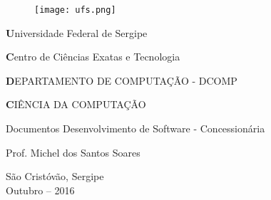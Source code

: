 \begin{titlepage}

\newcommand{\universidade}{Universidade Federal de Sergipe}
\newcommand{\centro}{Centro de Ciências Exatas e Tecnologia}
\newcommand{\departamento}{DEPARTAMENTO DE COMPUTAÇÃO - DCOMP}
\newcommand{\curso}{CIÊNCIA DA COMPUTAÇÃO}

\newcommand{\titulo}{Documentos Desenvolvimento de Software - Concessionária}

\newcommand{\professor}{Prof. Michel dos Santos Soares }

\begin{center}
\begin{figure}[t]
	\centering
	\texttt{[image: ufs.png]}
\end{figure}
{\large \textbf \universidade}
\par
{\large \textbf \centro}
\par
{\large \textbf \departamento}
\par
{\large \textbf \curso}
\par
\vspace{60pt}

{\large \titulo}
\par
\vspace{60pt}

{\large \professor}
\par
\vfill

{\large São Cristóvão, Sergipe}\\
{\large Outubro -- 2016}
\end{center}
\end{titlepage}



\newcommand{\alunoA}{DIMITRI CARVALHO MENEZES -- 201120000786}
\newcommand{\alunoB}{JOÃO MATEUS SANTANA DA CUNHA -- 201110007166}
\newcommand{\alunoC}{KEOMAS DA SILVA SANTOS -- 201220001370}
\newcommand{\alunoD}{LUCAS RENATO ARAGÃO SILVA -- 201220001325}
\newcommand{\alunoE}{RAABE NOA SANTOS CORREIA -- 201110008850}
\newcommand{\alunoF}{THARLYSSON BRENO LIMA DE MENEZES -- 201220002117}

\newcommand{\alunoG}{JOMAR GONÇALVES RAMOS -- 201020000940}
\newcommand{\alunoH}{LUCAS DE OLIVEIRA MACÊDO -- 201500018252}

\setcounter{page}{2}

